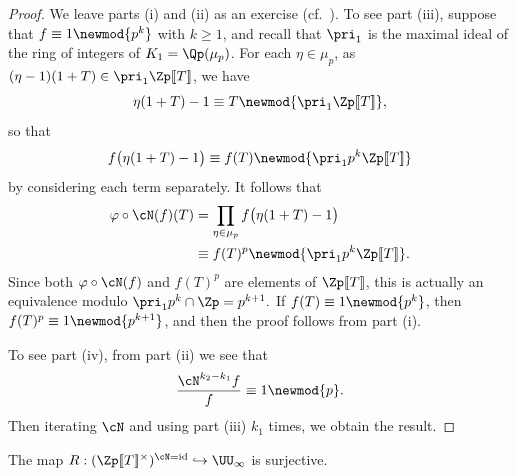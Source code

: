 \documentclass[a4paper,10pt, english, reqno]{smfart}
\newcommand{\lsem}{[\! [}
\newcommand{\rsem}{]\! ]}
\numberwithin{equation}{section}
\begin{document}
\begin{proof}
We leave parts (i) and (ii) as an exercise (cf.\ \cite[Lem.\ 2.3.1]{CS06}). To see part (iii), suppose that $f \equiv 1 \newmod{p^k}$ with $k\geq 1$, and recall that $\pri_1$ is the maximal ideal of the ring of integers of $K_1 = \Qp(\mu_p)$. For each $\eta \in \mu_p$, as $(\eta - 1)(1+T) \in \pri_1\Zp\lsem T\rsem $, we have
\[\eta(1+T)- 1 \equiv T\newmod{\pri_1 \Zp\lsem T\rsem },\]
so that
\[f\big(\eta(1+T) - 1\big) \equiv f(T) \newmod{\pri_1 p^k \Zp\lsem T\rsem }\]
by considering each term separately. It follows that
\begin{align*}\varphi\circ \cN(f)(T) &= \prod_{\eta \in \mu_p} f\big(\eta(1+T) - 1\big)\\
&\equiv f(T)^p \newmod{\pri_1 p^k\Zp\lsem T\rsem }.
\end{align*}
Since both $\varphi\circ\cN(f)$ and $f(T)^p$ are elements of $\Zp\lsem T\rsem $, this is actually an equivalence modulo $\pri_1 p^k \cap \Zp = p^{k+1}.$ If $f(T) \equiv 1 \newmod{p^k}$, then $f(T)^p \equiv 1 \newmod{p^{k+1}}$, and then the proof follows from part (i).

To see part (iv), from part (ii) we see that
\[\frac{\cN^{k_2-k_1}f }{f} \equiv 1 \newmod{p}.\]
Then iterating $\cN$ and using part (iii) $k_1$ times, we obtain the result.
\end{proof}


\begin{proposition}\label{prop:R surjective}
	The map $R : (\Zp\lsem T\rsem^\times)^{\cN=\mathrm{id}} \hookrightarrow \UU_\infty$ is surjective.
\end{proposition}
\end{document}
